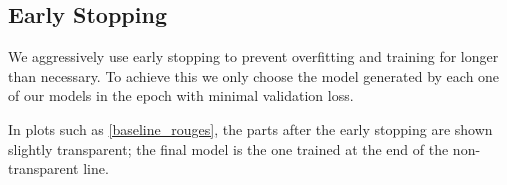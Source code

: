 \subsection{Early Stopping}
\label{early_stopping}
We aggressively use early stopping to prevent overfitting and training for longer than necessary.
To achieve this we only choose the model generated by each one of our models in the epoch with minimal validation loss.

In plots such as \cref{baseline_rouges}, the parts after the early stopping are shown slightly transparent; the final model is the one trained at the end of the non-transparent line.
